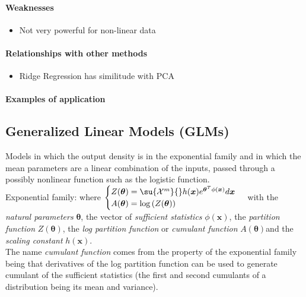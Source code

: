 \paragraph{Weaknesses}
\begin{itemize}
    \item Not very powerful for non-linear data

\end{itemize}

\paragraph{Relationships with other methods}
\begin{itemize}
    \item Ridge Regression has similitude with PCA
\end{itemize}

\paragraph{Examples of application}


\subsection{Generalized Linear Models (GLMs)}
Models in which the output density is in the exponential family and in which the mean
parameters are a linear combination of the inputs, passed through a possibly nonlinear
function such as the logistic function.\\
Exponential family:
where
$\begin{cases}
    Z(\bm{\theta}) = \su{\mathcal{X}^{m}}{}h(\bm{x})e^{\bm{\theta}^{T}\phi(\bm{x})}
    d\bm{x} \\
    A(\bm{\theta}) = \log\left(Z(\bm{\theta})\right)
\end{cases}$
with the \emph{natural parameters} $\bm{\theta}$, the vector of  \emph{sufficient 
statistics} $\phi(\bm{x})$, the \emph{partition function} $Z(\bm{\theta})$, the 
\emph{log partition function} or \emph{cumulant function} $A(\bm{\theta})$and the 
\emph{scaling constant} $h(\bm{x})$.\\
The name \emph{cumulant function} comes from the property of the exponential family 
being that derivatives of the log partition function can be used to generate cumulant
of the sufficient statistics (the first and second cumulants of a distribution being
its mean and variance).
